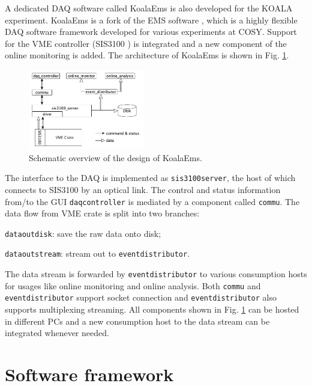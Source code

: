 \documentclass[number,5p]{elsarticle}
\begin{document}
A dedicated DAQ software called KoalaEms is also developed for the KOALA experiment.
KoalaEms is a fork of the EMS software \cite{ems}, which is a highly flexible DAQ software framework developed for various experiments at COSY.
Support for the VME controller (SIS3100 \cite{sis}) is integrated and a new
component of the online monitoring is added.
The architecture of KoalaEms is shown in Fig. \ref{fig:koalaems}.
\begin{figure}[h]
  \centering
  \includegraphics[width=0.45\textwidth]{./koalaems_deployment.png}
  \caption{Schematic overview of the design of KoalaEms.}
  \label{fig:koalaems}
\end{figure}
The interface to the DAQ is implemented as \texttt{sis3100\textunderscore server}, the host of which
connects to SIS3100 by an optical link.
The control and status information from/to the GUI \texttt{daq\textunderscore controller} is mediated by a component called \texttt{commu}.
The data flow from VME crate is split into two branches:
\begin{enumerate*}[label=(\roman*)]
\item \texttt{data\textunderscore out\textunderscore di\allowbreak sk}: save the raw data onto disk;
\item \texttt{data\textunderscore out\textunderscore stream}: stream out to \texttt{event\textunderscore distributor}.
\end{enumerate*}
The data stream is forwarded by \texttt{event\textunderscore distributor} to various consumption hosts for usages like online monitoring and online analysis.
Both \texttt{commu} and \texttt{event\textunderscore distributor} support socket connection and \texttt{event\textunderscore distributor} also supports multiplexing streaming.
All components shown in Fig. \ref{fig:koalaems} can be hosted in different PCs
and a new consumption host to the data stream can be integrated whenever needed.

\section{Software framework}
\label{sec:software}
\end{document}

